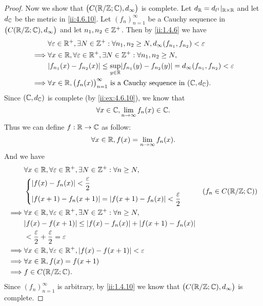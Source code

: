 \begin{proof}
  Now we show that \(\big(C(\mathbb{R} / \mathbb{Z} ; \mathbb{C}), d_\infty\big)\) is complete.
  Let \(d_{\mathbb{R}} = d_{l^1}|_{\mathbb{R} \times \mathbb{R}}\) and let \(d_{\mathbb{C}}\) be the metric in \cref{ii:4.6.10}.
  Let \((f_n)_{n = 1}^\infty\) be a Cauchy sequence in \(\big(C(\mathbb{R} / \mathbb{Z} ; \mathbb{C}), d_\infty\big)\) and let \(n_1, n_2 \in \mathbb{Z}^+\).
  Then by \cref{ii:1.4.6} we have
  \begin{align*}
             & \forall \varepsilon \in \R^+, \exists N \in \Z^+ : \forall n_1, n_2 \geq N, d_\infty(f_{n_1}, f_{n_2}) < \varepsilon        \\
    \implies & \forall x \in \R, \forall \varepsilon \in \R^+, \exists N \in \Z^+ : \forall n_1, n_2 \geq N,                               \\
             & \abs{f_{n_1}(x) - f_{n_2}(x)} \leq \sup_{y \in \R} \abs{f_{n_1}(y) - f_{n_2}(y)} = d_\infty(f_{n_1}, f_{n_2}) < \varepsilon \\
    \implies & \forall x \in \R, \big(f_n(x)\big)_{n = 1}^\infty \text{ is a Cauchy sequence in } (\C, d_{\C}).
  \end{align*}
  Since \((\mathbb{C}, d_{\mathbb{C}})\) is complete (by \cref{ii:ex:4.6.10}), we know that
  \[
    \forall x \in \mathbb{C}, \lim_{n \to \infty} f_n(x) \in \mathbb{C}.
  \]
  Thus we can define \(f : \mathbb{R} \to \mathbb{C}\) as follow:
  \[
    \forall x \in \mathbb{R}, f(x) = \lim_{n \to \infty} f_n(x).
  \]
  And we have
  \begin{align*}
             & \forall x \in \R, \forall \varepsilon \in \R^+, \exists N \in \Z^+ : \forall n \geq N, \\
             & \begin{dcases}
                 \abs{f(x) - f_n(x)} < \dfrac{\varepsilon}{2} \\
                 \abs{f(x + 1) - f_n(x + 1)} = \abs{f(x + 1) - f_n(x)} < \dfrac{\varepsilon}{2}
               \end{dcases}         & (f_n \in C(\R / \Z ; \C))          \\
    \implies & \forall x \in \R, \forall \varepsilon \in \R^+, \exists N \in \Z^+ : \forall n \geq N, \\
             & \abs{f(x) - f(x + 1)} \leq \abs{f(x) - f_n(x)} + \abs{f(x + 1) - f_n(x)}               \\
             & < \dfrac{\varepsilon}{2} + \dfrac{\varepsilon}{2} = \varepsilon                        \\
    \implies & \forall x \in \R, \forall \varepsilon \in \R^+, \abs{f(x) - f(x + 1)} < \varepsilon    \\
    \implies & \forall x \in \R, f(x) = f(x + 1)                                                      \\
    \implies & f \in C(\R / \Z ; \C).
  \end{align*}
  Since \((f_n)_{n = 1}^\infty\) is arbitrary, by \cref{ii:1.4.10} we know that \(\big(C(\mathbb{R} / \mathbb{Z} ; \mathbb{C}), d_\infty\big)\) is complete.
\end{proof}
